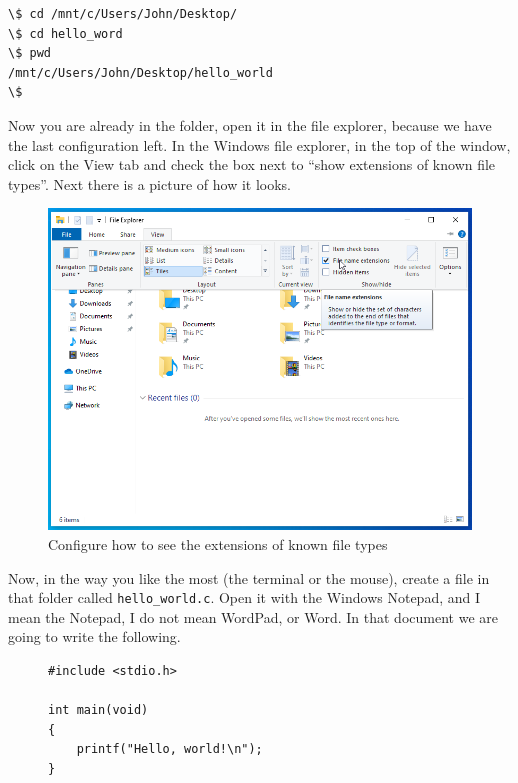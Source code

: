 \documentclass[a4paper]{article}
\begin{document}
\noindent
\begin{minipage}[H]{\linewidth}
\mbox{}
\begin{lstlisting}[style=terminalStyle]
\$ cd /mnt/c/Users/John/Desktop/
\$ cd hello_word
\$ pwd
/mnt/c/Users/John/Desktop/hello_world
\$
\end{lstlisting}
\end{minipage}

Now you are already in the folder, open it in the file explorer, because we
have the last configuration left. In the Windows file explorer, in the top of
the window, click on the View tab and check the box next to ``show extensions
of known file types''. Next there is a picture of how it looks.

\begin{figure}[H]
    \includegraphics[width=\linewidth]{extensions_en}
    \caption{Configure how to see the extensions of known file types}
    \label{img:extensions}
\end{figure}

Now, in the way you like the most (the terminal or the mouse), create a file
in that folder called \verb!hello_world.c!. Open it with the Windows Notepad,
and I mean the Notepad, I do not mean WordPad, or Word. In that document we are
going to write the following.

\begin{figure}[H]
\begin{verbatim}
#include <stdio.h>

int main(void)
{
    printf("Hello, world!\n");
}
\end{verbatim}
\end{figure}
\end{document}
